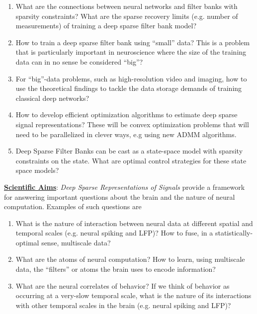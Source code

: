 \documentclass[12pt]{article}
\begin{document}
\begin{enumerate}
	\item What are the connections between neural networks and filter banks with sparsity constraints?  What are the sparse recovery limits (e.g. number of measurements) of training a deep sparse filter bank model?
	
	\item How to train a deep sparse filter bank using ``small'' data? This is a problem that is particularly important in neuroscience where the size of the training data can in no sense be considered ``big''?
	\item For ``big''-data problems, such as high-resolution video and imaging, how to use the theoretical findings to tackle the data storage demands of training classical deep networks?

	\item How to develop efficient optimization algorithms to estimate deep sparse signal representations? These will be convex optimization problems that will need to be parallelized in clever ways, e.g using new ADMM algorithms.	
	
	\item Deep Sparse Filter Banks can be cast as a state-space model with sparsity constraints on the state. What are optimal control strategies for these state space models?		
	
\end{enumerate}

\noindent \textbf{\underline{Scientific Aims}}: \emph{Deep Sparse Representations of Signals} provide a framework for answering important questions about the brain and the nature of neural computation. Examples of such questions are
\begin{enumerate}
	\item What is the nature of interaction between neural data at different spatial and temporal scales (e.g. neural spiking and LFP)? How to fuse, in a statistically-optimal sense, multiscale data?
	\item What are the atoms of neural computation? How to learn, using multiscale data, the ``filters'' or atoms the brain uses to encode information?
	\item What are the neural correlates of behavior? If we think of behavior as occurring at a very-slow temporal scale, what is the nature of its interactions with other temporal scales in the brain (e.g. neural spiking and LFP)?
\end{enumerate}
\end{document}
